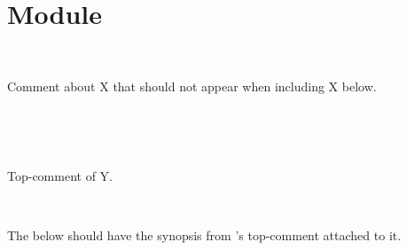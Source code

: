 \section{Module }\label{Include2}%
\label{Include2-module-X}\begin{ocamlindent}\label{Include2-X-type-t}\\
\end{ocamlindent}%
\begin{ocamlindent}Comment about X that should not appear when including X below.\end{ocamlindent}%
\medbreak
{}      \hyperref[Include2-X]{} \label{Include2-type-t}\\
\label{Include2-module-Y}\begin{ocamlindent}\label{Include2-Y-type-t}\\
\end{ocamlindent}%
\begin{ocamlindent}Top-comment of Y.\end{ocamlindent}%
\medbreak
\label{Include2-module-Y_include_synopsis}\begin{ocamlindent}      \hyperref[Include2-Y]{} \label{Include2-Y_include_synopsis-type-t}\\
\end{ocamlindent}%
\begin{ocamlindent}The  below should have the synopsis from 's top-comment attached to it.\end{ocamlindent}%
